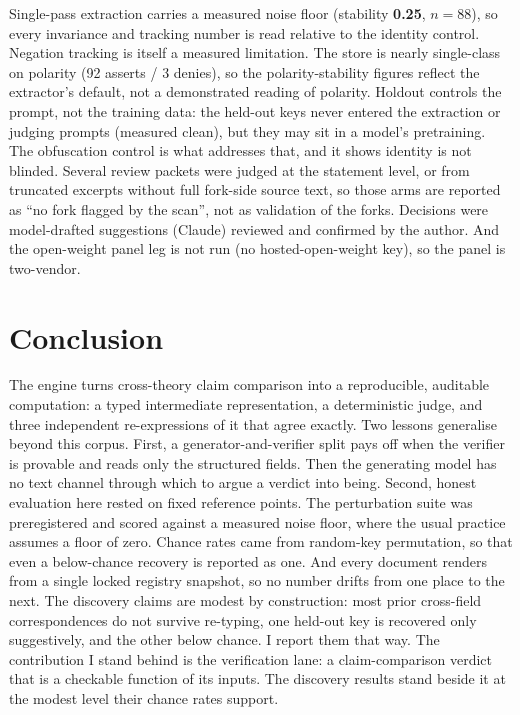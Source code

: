 \documentclass[11pt]{article}
\begin{document}
Single-pass extraction carries a measured noise floor (stability \textbf{0.25}, $n = 88$), so every
invariance and tracking number is read relative to the identity control. Negation tracking is itself a
measured limitation. The store is nearly single-class on polarity (92 asserts / 3 denies), so the
polarity-stability figures reflect the extractor's default, not a demonstrated reading of polarity. Holdout
controls the prompt, not the training data: the held-out keys never entered the extraction or judging
prompts (measured clean), but they may sit in a model's pretraining. The obfuscation control is what
addresses that, and it shows identity is not blinded. Several review packets were judged at the statement
level, or from truncated excerpts without full fork-side source text, so those arms are reported as ``no
fork flagged by the scan'', not as validation of the forks. Decisions were model-drafted suggestions
(Claude) reviewed and confirmed by the author. And the open-weight panel leg is not run (no
hosted-open-weight key), so the panel is two-vendor.

\section{Conclusion}
The engine turns cross-theory claim comparison into a reproducible, auditable computation: a typed
intermediate representation, a deterministic judge, and three independent re-expressions of it that agree
exactly. Two lessons generalise beyond this corpus. First, a generator-and-verifier split pays off when the
verifier is provable and reads only the structured fields. Then the generating model has no text channel
through which to argue a verdict into being. Second, honest evaluation here rested on fixed reference
points. The perturbation suite was preregistered and scored against a measured noise floor, where the usual
practice assumes a floor of zero. Chance rates came from random-key permutation, so that even a below-chance
recovery is reported as
one. And every document renders from a single locked registry snapshot, so no number drifts from one place
to the next. The discovery claims are modest by construction: most prior cross-field correspondences do not
survive re-typing, one held-out key is recovered only suggestively, and the other below chance. I report
them that way. The contribution I stand behind is the verification lane: a
claim-comparison verdict that is a checkable function of its inputs. The discovery results stand beside it
at the modest level their chance rates support.



\end{document}
